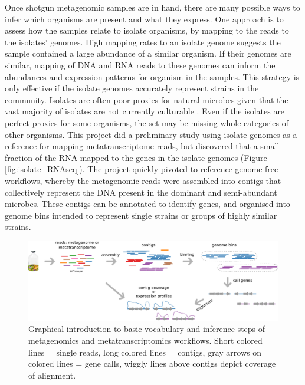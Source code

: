 Once shotgun metagenomic samples are in hand, there are many possible ways to infer which organisms are present and what they express.
One approach is to assess how the samples relate to isolate organisms, by mapping to the reads to the isolates' genomes.
High mapping rates to an isolate genome suggests the sample contained a large abundance of a similar organism.
If their genomes are similar, mapping of DNA and RNA reads to these genomes can inform the abundances and expression patterns for organism in the samples.
This strategy is only effective if the isolate genomes accurately represent strains in the community.
Isolates are often poor proxies for natural microbes given that the vast majority of isolates are not currently culturable \cite{kaeberlein2002, stewart2012}.
Even if the isolates are perfect proxies for some organisms, the set may be missing whole categories of other organisms.
This project did a preliminary study using isolate genomes as a reference for mapping metatranscriptome reads, but discovered that a small fraction of the RNA mapped to the genes in the isolate genomes (Figure \ref{fig:isolate_RNAseq}).
The project quickly pivoted to reference-genome-free workflows, whereby the metagenomic reads were assembled into contigs that collectively represent the DNA present in the dominant and semi-abundant microbes.
These contigs can be annotated to identify genes, and organised into genome bins intended to represent single strains or groups of highly similar strains.

\begin{figure}[H]
\centering
    \includegraphics[width=1.0\textwidth]{./tex/chapter2/figures/170312_metagenomics_metatranscriptomics_overview.pdf}
    \begin{singlespace}
    \caption[Overview of metagenomics/metatranscriptomics workflow]{
       Graphical introduction to basic vocabulary and inference steps of metagenomics and metatranscriptomics workflows.
	   Short colored lines = single reads, long colored lines = contigs,
	   gray arrows on colored lines = gene calls, wiggly lines above contigs depict coverage of alignment.}
    \label{fig:meta_workflow}
    \end{singlespace}
\end{figure}

